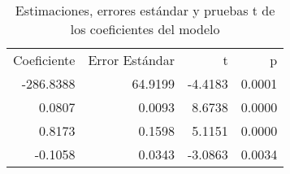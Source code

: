 \begin{table}[H]
    \centering
    \color{blue}
    \caption{Estimaciones, errores estándar y pruebas t de los coeficientes del modelo}
    \label{tab:coeficientes_regresion}
    \begin{tabular}{rrrr}
        
        Coeficiente & Error Estándar & t & p \\
        
        -286.8388 & 64.9199 & -4.4183 & 0.0001 \\
        0.0807    & 0.0093  &  8.6738 & 0.0000 \\
        0.8173    & 0.1598  &  5.1151 & 0.0000 \\
        -0.1058   & 0.0343  & -3.0863 & 0.0034 \\
        
    \end{tabular}
\end{table}
